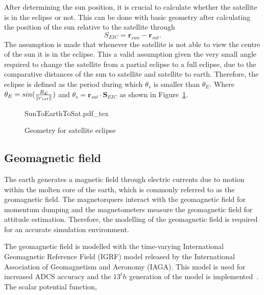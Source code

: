 After determining the sun position, it is crucial to calculate whether the satellite is in the eclipse or not. This can be done with basic geometry after calculating the position of the sun relative to the satellite through
\begin{equation}
S_{EIC} = \mathbf{r}_{sun} - \mathbf{r}_{sat}.
\end{equation}
The assumption is made that whenever the satellite is not able to view the centre of the sun it is in the eclipse. This a valid assumption given the very small angle required to change the satellite from a partial eclipse to a full eclipse, due to the comparative distances of the sun to satellite and satellite to earth. Therefore, the eclipse is defined as the period during which $\theta_{s}$ is smaller than $\theta_E$. Where $\theta_E = sin(\frac{R_E}{\left\lVert r_{sat}\right\rVert})$ and $\theta_{s} = \mathbf{r}_{sat} \cdot \mathbf{S}_{EIC}$ as shown in Figure~\ref{fig:SunToEarthToSat}.

\begin{figure}[!htb]
	\centering
	\def\svgwidth{12cm}
	{SunToEarthToSat.pdf_tex}
	\label{fig:SunToEarthToSat}
	\caption{Geometry for satellite eclipse}
\end{figure}


\subsection{Geomagnetic field}

The earth generates a magnetic field through electric currents due to motion within the molten core of the earth, which is commonly referred to as the geomagnetic field. The magnetorquers interact with the geomagnetic field for momentum dumping and the magnetometers measure the geomagnetic field for attitude estimation. Therefore, the modelling of the geomagnetic field is required for an accurate simulation environment.

The geomagnetic field is modelled with the time-varying International Geomagnetic Reference Field (IGRF) model released by the International Association of Geomagnetism and Aeronomy (IAGA). This model is used for increased ADCS accuracy and the $13^th$ generation of the model is implemented~\cite{alken2021international}. The scalar potential function,

